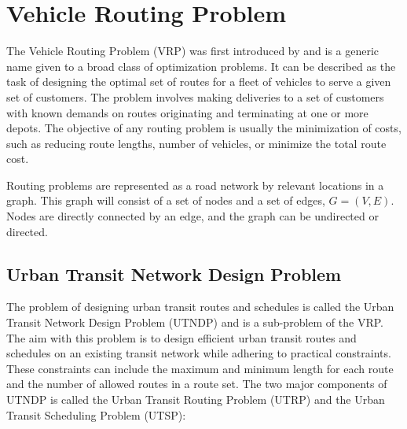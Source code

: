 \section{Vehicle Routing Problem }
\label{sec:VRP}
The Vehicle Routing Problem (VRP) was first introduced by \citet{dantzig59} and is a generic name given to a broad class of optimization problems. It can be described as the task of designing the optimal set of routes for a fleet of vehicles to serve a given set of customers. The problem involves making deliveries to a set of customers with known demands on routes originating and terminating at one or more depots. The objective of any routing problem is usually the minimization of costs, such as reducing route lengths, number of vehicles, or minimize the total route cost.

Routing problems are represented as a road network by relevant locations in a graph. This graph will consist of a set of nodes and a set of edges, $G = (V,E)$. Nodes are directly connected by an edge, and the graph can be undirected or directed. 

\subsection{Urban Transit Network Design Problem}

The problem of designing urban transit routes and schedules is called the Urban Transit Network Design Problem (UTNDP) and is a sub-problem of the VRP. The aim with this problem is to design efficient urban transit routes and schedules on an existing transit network while adhering to practical constraints. These constraints can include the maximum and minimum length for each route and the number of allowed routes in a route set. The two major components of UTNDP is called the Urban Transit Routing Problem (UTRP) and the Urban Transit Scheduling Problem (UTSP):

